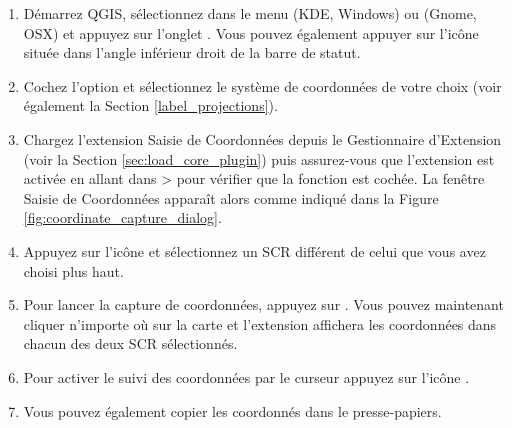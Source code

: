 \begin{enumerate}
  \item Démarrez QGIS, sélectionnez  dans le menu 
   (KDE, Windows) ou  (Gnome, OSX) 
  et appuyez sur l'onglet .
  Vous pouvez également appuyer sur l'icône 
  située dans l'angle inférieur droit de la barre de statut.
  \item Cochez l'option  et
  sélectionnez le système de coordonnées de votre choix (voir également
  la Section \ref{label_projections}).
  \item Chargez l'extension Saisie de Coordonnées depuis le Gestionnaire
  d'Extension (voir la Section \ref{sec:load_core_plugin}) puis assurez-vous
  que l'extension est activée en allant dans  >  
  pour vérifier que la fonction  est cochée. 
   La fenêtre Saisie de Coordonnées apparaît alors comme indiqué dans 
  la Figure \ref{fig:coordinate_capture_dialog}.
  \item Appuyez sur l'icône  
  et sélectionnez un SCR différent de celui que vous avez choisi plus haut.
  \item Pour lancer la capture de coordonnées, appuyez sur . 
  Vous pouvez maintenant cliquer n'importe où sur la carte et l'extension 
  affichera les coordonnées dans chacun des deux SCR sélectionnés.
  \item Pour activer le suivi des coordonnées par le curseur appuyez sur 
  l'icône .
  \item Vous pouvez également copier les coordonnés dans le presse-papiers.
\end{enumerate}

\newpage

